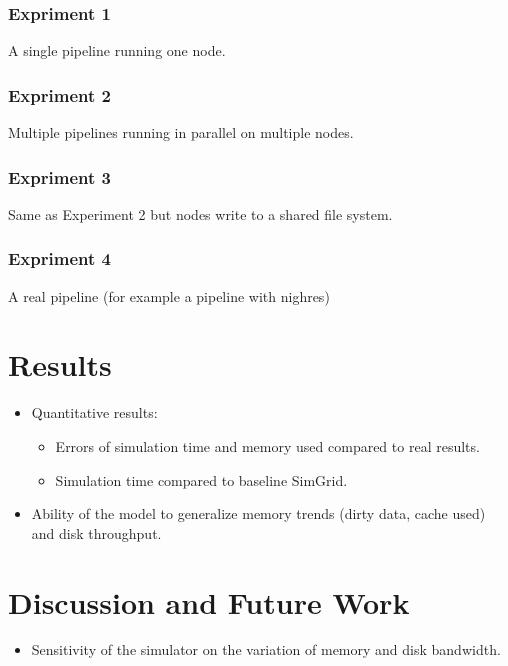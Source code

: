 \documentclass[conference]{IEEEtran}
\begin{document}
			\subsubsection{Expriment 1}
				A single pipeline running one node.
			\subsubsection{Expriment 2}
				Multiple pipelines running in parallel on multiple nodes.
			\subsubsection{Expriment 3}
				Same as Experiment 2 but nodes write to a shared file system.
			\subsubsection{Expriment 4}
				A real pipeline (for example a pipeline with nighres)

	\section{Results}
	
		\begin{itemize}

			\item Quantitative results: 
				\begin{itemize}
					\item Errors of simulation time and memory used compared to real results.
					\item Simulation time compared to baseline SimGrid.
				\end{itemize} 

			\item Ability of the model to generalize memory trends (dirty data, cache used) and disk throughput.

		\end{itemize}

	\section{Discussion and Future Work}
		\begin{itemize}
			\item Sensitivity of the simulator on the variation of memory and disk bandwidth. 
		\end{itemize}


\end{document}
